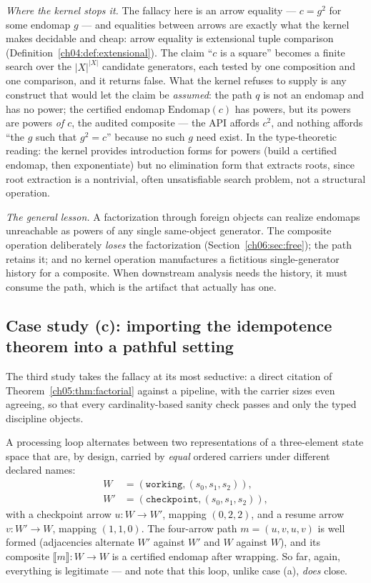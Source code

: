 \emph{Where the kernel stops it.} The fallacy here is an arrow equality
--- $c = g^{2}$ for some endomap $g$ --- and equalities between arrows are
exactly what the kernel makes decidable and cheap: arrow equality is
extensional tuple comparison (Definition~\ref{ch04:def:extensional}). The
claim ``$c$ is a square'' becomes a finite search over the $|X|^{|X|}$
candidate generators, each tested by one composition and one comparison,
and it returns false. What the kernel refuses to supply is any construct
that would let the claim be \emph{assumed}: the path $q$ is not an endomap
and has no power; the certified endomap $\mathrm{Endomap}(c)$ has powers,
but its powers are powers \emph{of $c$}, the audited composite --- the
API affords $c^{2}$, and nothing affords ``the $g$ such that
$g^{2} = c$'' because no such $g$ need exist. In the type-theoretic
reading: the kernel provides introduction forms for powers (build a
certified endomap, then exponentiate) but no elimination form that
extracts roots, since root extraction is a nontrivial, often unsatisfiable
search problem, not a structural operation.

\emph{The general lesson.} A factorization through foreign objects can
realize endomaps unreachable as powers of any single same-object
generator. The composite operation deliberately \emph{loses} the
factorization (Section~\ref{ch06:sec:free}); the path retains it; and no
kernel operation manufactures a fictitious single-generator history for a
composite. When downstream analysis needs the history, it must consume the
path, which is the artifact that actually has one.

\subsection{Case study (c): importing the idempotence theorem into a
pathful setting}
\label{ch06:sec:case-c}

The third study takes the fallacy at its most seductive: a direct citation
of Theorem~\ref{ch05:thm:factorial} against a pipeline, with the carrier
sizes even agreeing, so that every cardinality-based sanity check passes
and only the typed discipline objects.

\begin{example}[Setup]
\label{ch06:ex:case-c}
A processing loop alternates between two representations of a
three-element state space that are, by design, carried by \emph{equal}
ordered carriers under different declared names:
\begin{align*}
  W   &= (\texttt{working}, (s_0, s_1, s_2)), \\
  W'  &= (\texttt{checkpoint}, (s_0, s_1, s_2)),
\end{align*}
with a checkpoint arrow $u : W \to W'$, mapping $(0, 2, 2)$, and a resume
arrow $v : W' \to W$, mapping $(1, 1, 0)$. The four-arrow path
$m = (u, v, u, v)$ is well formed (adjacencies alternate $W'$ against
$W'$ and $W$ against $W$), and its composite
$\llbracket m \rrbracket : W \to W$ is a certified endomap after wrapping.
So far, again, everything is legitimate --- and note that this loop, unlike
case (a), \emph{does} close.
\end{example}

